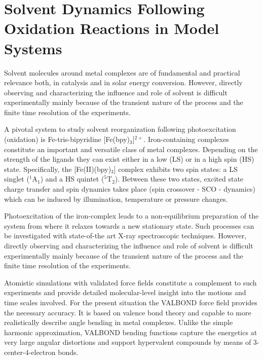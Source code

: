 \documentclass[journal=jacsat,manuscript=article]{achemso}
\author{Akshaya K. Das and Markus Meuwly}
\affiliation{Department of Chemistry, University of Basel, Klingelbergstrasse 80, CH-4056 Basel, Switzerland.}
\date{\today}
\title{}
\begin{document}
\begin{abstract}

\end{abstract}

\clearpage

\section{Solvent Dynamics Following Oxidation Reactions in Model Systems}
Solvent molecules around metal complexes are of fundamental and
practical relevance both, in catalysis and in solar energy
conversion.\cite{Balzani96,macchioni,Kalyan98} However, directly
observing and characterizing the influence and role of solvent is
difficult experimentally mainly because of the transient nature of the
process and the finite time resolution of the experiments.

A pivotal system to study solvent reorganization following
photoexcitation (oxidation) is Fe-tris-bipyridine
[Fe(bpy)$_3$]$^{2+}$. Iron-containing complexes constitute an
important and versatile class of metal complexes. Depending on the
strength of the ligands they can exist either in a low (LS) or in a
high spin (HS) state. Specifically, the [Fe(II)(bpy)$_3$] complex
exhibits two spin states: a LS singlet ($^1$A$_1$) and a HS quintet
($^5$T$_2$).\cite{scienceChergui,Gaffney} Between these two states,
excited state charge transfer and spin dynamics takes place (spin
crossover - SCO - dynamics) which can be induced by illumination,
temperature or pressure changes.\cite{Haldrup}

Photoexcitation of the iron-complex leads to a non-equilibrium
preparation of the system from where it relaxes towards a new
stationary state. Such processes can be investigated with state-of-the
art X-ray spectroscopic techniques. However, directly observing and
characterizing the influence and role of solvent is difficult
experimentally mainly because of the transient nature of the process
and the finite time resolution of the experiments.

Atomistic simulations with validated force fields constitute a
complement to such experiments and provide detailed molecular-level
insight into the motions and time scales involved. For the present
situation the VALBOND force field provides the necessary accuracy. It
is based on valence bond theory and capable to more realistically
describe angle bending in metal
complexes.\cite{Landis1,Landis2,Landis3} Unlike the simple harmonic
approximation, VALBOND bending functions capture the energetics at
very large angular distortions and support hypervalent compounds by
means of 3-center-4-electron bonds.\cite{Landis2}
\end{document}

